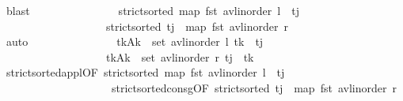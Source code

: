 \begin{isabellebody}
\ blast{\isacharplus}{\kern0pt}\isanewline
\ \ \ \ \ \ \ \ \ \ \ \ \isamarkupfalse%
\ \isamarkupfalse%
\ {\isachardoublequoteopen}strict{\isacharunderscore}{\kern0pt}sorted\ {\isacharparenleft}{\kern0pt}map\ fst\ {\isacharparenleft}{\kern0pt}avl{\isacharunderscore}{\kern0pt}inorder\ l{\isacharparenright}{\kern0pt}\ {\isacharat}{\kern0pt}\ {\isacharbrackleft}{\kern0pt}t\isactrlsub j{\isacharbrackright}{\kern0pt}{\isacharparenright}{\kern0pt}{\isachardoublequoteclose}\ \isanewline
\ \ \ \ \ \ \ \ \ \ \ \ \ \ \ \ \ \ \ {\isachardoublequoteopen}strict{\isacharunderscore}{\kern0pt}sorted\ {\isacharparenleft}{\kern0pt}t\isactrlsub j\ {\isacharhash}{\kern0pt}\ map\ fst\ {\isacharparenleft}{\kern0pt}avl{\isacharunderscore}{\kern0pt}inorder\ r{\isacharparenright}{\kern0pt}{\isacharparenright}{\kern0pt}{\isachardoublequoteclose}\isanewline
\ \ \ \ \ \ \ \ \ \ \ \ \ \ \isamarkupfalse%
\ auto\isanewline
\ \ \ \ \ \ \ \ \ \ \ \ \isamarkupfalse%
\ \isamarkupfalse%
\ {\isachardoublequoteopen}{\isasymforall}{\isacharparenleft}{\kern0pt}t\isactrlsub k{\isacharcomma}{\kern0pt}A\isactrlsub k{\isacharparenright}{\kern0pt}\ {\isasymin}\ set\ {\isacharparenleft}{\kern0pt}avl{\isacharunderscore}{\kern0pt}inorder\ l{\isacharparenright}{\kern0pt}{\isachardot}{\kern0pt}\ t\isactrlsub k\ {\isacharless}{\kern0pt}\ t\isactrlsub j{\isachardoublequoteclose}\ \isanewline
\ \ \ \ \ \ \ \ \ \ \ \ \ \ \ \ \ \ \ {\isachardoublequoteopen}{\isasymforall}{\isacharparenleft}{\kern0pt}t\isactrlsub k{\isacharcomma}{\kern0pt}A\isactrlsub k{\isacharparenright}{\kern0pt}\ {\isasymin}\ set\ {\isacharparenleft}{\kern0pt}avl{\isacharunderscore}{\kern0pt}inorder\ r{\isacharparenright}{\kern0pt}{\isachardot}{\kern0pt}\ t\isactrlsub j\ {\isacharless}{\kern0pt}\ t\isactrlsub k{\isachardoublequoteclose}\isanewline
\ \ \ \ \ \ \ \ \ \ \ \ \ \ \isamarkupfalse%
\ strict{\isacharunderscore}{\kern0pt}sorted{\isacharunderscore}{\kern0pt}appl{\isacharbrackleft}{\kern0pt}OF\ {\isacartoucheopen}strict{\isacharunderscore}{\kern0pt}sorted\ {\isacharparenleft}{\kern0pt}map\ fst\ {\isacharparenleft}{\kern0pt}avl{\isacharunderscore}{\kern0pt}inorder\ l{\isacharparenright}{\kern0pt}\ {\isacharat}{\kern0pt}\ {\isacharbrackleft}{\kern0pt}t\isactrlsub j{\isacharbrackright}{\kern0pt}{\isacharparenright}{\kern0pt}{\isacartoucheclose}{\isacharbrackright}{\kern0pt}\ \isanewline
\ \ \ \ \ \ \ \ \ \ \ \ \ \ \ \ \ \ \ \ strict{\isacharunderscore}{\kern0pt}sorted{\isacharunderscore}{\kern0pt}consg{\isacharbrackleft}{\kern0pt}OF\ {\isacartoucheopen}strict{\isacharunderscore}{\kern0pt}sorted\ {\isacharparenleft}{\kern0pt}t\isactrlsub j\ {\isacharhash}{\kern0pt}\ map\ fst\ {\isacharparenleft}{\kern0pt}avl{\isacharunderscore}{\kern0pt}inorder\ r{\isacharparenright}{\kern0pt}{\isacharparenright}{\kern0pt}{\isacartoucheclose}{\isacharbrackright}{\kern0pt}\isanewline

\end{isabellebody}
